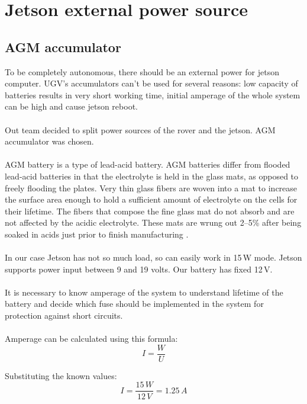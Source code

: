 \documentclass[]{IEEEphot}
\begin{document}
\section{Jetson external power source}

\subsection{AGM accumulator}

To be completely autonomous, there should be an external power for jetson computer. UGV’s accumulators can’t be used for several reasons: low capacity of batteries results in very short working time, initial amperage of the whole system can be high and cause jetson reboot.
\\\\
Out team decided to split power sources of the rover and the jetson. AGM accumulator was chosen.
\\\\
AGM battery is a type of lead-acid battery. AGM batteries differ from flooded lead-acid batteries in that the electrolyte is held in the glass mats, as opposed to freely flooding the plates. Very thin glass fibers are woven into a mat to increase the surface area enough to hold a sufficient amount of electrolyte on the cells for their lifetime. The fibers that compose the fine glass mat do not absorb and are not affected by the acidic electrolyte. These mats are wrung out 2--5\% after being soaked in acids just prior to finish manufacturing \cite{agm_charging, agm_discharge}.
\\\\
In our case Jetson has not so much load, so can easily work in 15\,W mode. Jetson supports power input between 9 and 19 volts. Our battery has fixed 12\,V.
\\\\
It is necessary to know amperage of the system to understand lifetime of the battery and decide which fuse should be implemented in the system for protection against short circuits.
\\\\
Amperage can be calculated using this formula:
\begin{equation}
I = \frac{W}{U}
\end{equation}

Substituting the known values:
\begin{equation}
I = \frac{15\,W}{12\,V} = 1.25\,A
\end{equation}
\end{document}
